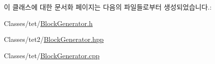 이 클래스에 대한 문서화 페이지는 다음의 파일들로부터 생성되었습니다.\+:\begin{DoxyCompactItemize}
\item 
Classes/tet/\hyperlink{_block_generator_8h}{Block\+Generator.\+h}\item 
Classes/tet2/\hyperlink{_block_generator_8hpp}{Block\+Generator.\+hpp}\item 
Classes/tet/\hyperlink{_block_generator_8cpp}{Block\+Generator.\+cpp}\end{DoxyCompactItemize}
